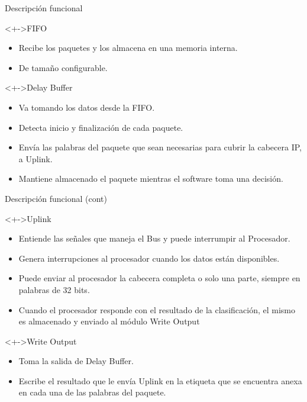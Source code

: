 \documentclass[xcolor=dvipsnames]{beamer}
\begin{document}
\begin{frame}{Descripción funcional}

\begin{block}<+->{FIFO}   
    \begin{itemize}
      \scriptsize
     	\item Recibe los paquetes y los almacena en una memoria interna.
	\item De tamaño configurable.
    \end{itemize}
  \end{block}
\begin{block}<+->{Delay Buffer}   
    \begin{itemize}
      \scriptsize
     	\item Va tomando los datos desde la FIFO.
	\item Detecta inicio y finalización de cada paquete.
	\item Envía las palabras del paquete que sean necesarias para cubrir la cabecera IP, a Uplink.
	\item Mantiene almacenado el paquete mientras el software toma una decisión.
    \end{itemize}
  \end{block}
\end{frame}
\begin{frame}{Descripción funcional (cont)}
  \begin{block}<+->{Uplink}   
    \begin{itemize}
      \scriptsize
     	\item Entiende las señales que maneja el Bus y puede interrumpir al Procesador.
	\item Genera interrupciones al procesador cuando los datos están disponibles.
	\item Puede enviar al procesador la cabecera completa o solo una parte, siempre en palabras de 32 bits.
	\item Cuando el procesador responde con el resultado de la clasificación, el mismo es almacenado y enviado al módulo Write Output
    \end{itemize}
  \end{block}
\begin{block}<+->{Write Output}   
    \begin{itemize}
      \scriptsize
     	\item Toma la salida de Delay Buffer.
	\item Escribe el resultado que le envía Uplink en la etiqueta que se encuentra anexa en cada una de las palabras del paquete.
    \end{itemize}
  \end{block}
\end{frame}
\end{document}
